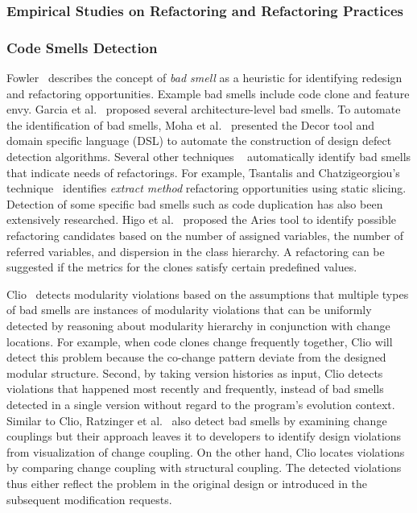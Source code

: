 \documentclass[runningheads,a4paper]{llncs}
\begin{document}
\subsubsection{Empirical Studies on Refactoring and Refactoring Practices} 

\subsubsection{Code Smells Detection} 

Fowler~\cite{fowler:refactor99} describes the concept of {\em bad smell} as a heuristic for identifying redesign and refactoring opportunities. Example bad smells include code clone and feature envy. Garcia et al.~\cite{garcia:csmr09} proposed several architecture-level bad smells. To automate the identification of bad smells, Moha et al.~\cite{moha:fase08} presented the Decor tool and domain specific language (DSL) to automate the construction of design defect detection algorithms.  Several other techniques ~\cite{tsantalis:csmr09, tsantalis:tse09, tsantalis:csmr08} automatically identify bad smells that indicate needs of refactorings. For example, Tsantalis and Chatzigeorgiou's technique~\cite{tsantalis:csmr09} identifies {\em extract method} refactoring opportunities using static slicing. Detection of some specific bad smells such as code duplication has also been extensively researched. Higo et al.~\cite{higo:profes04} proposed the Aries tool to identify possible refactoring candidates based on the number of assigned variables, the number of referred variables, and dispersion in the class hierarchy. A refactoring can be suggested if the metrics for the clones satisfy certain predefined values.

Clio~\cite{Wong2011:cleo} detects modularity violations based on the assumptions that multiple types of bad smells are instances of modularity violations that can be uniformly detected by reasoning about modularity hierarchy in conjunction with change locations.  For example, when code clones change frequently together, Clio will detect this problem because the co-change pattern deviate from the designed modular structure. Second, by taking version histories as input, Clio detects violations that happened most recently and frequently, instead of bad smells detected in a single version without regard to the program's evolution context. Similar to Clio, Ratzinger et al.~\cite{ratzinger:msr05} also detect bad smells by examining change couplings but their approach leaves it to developers to identify design violations from visualization of change coupling. On the other hand, Clio locates violations by comparing change coupling with structural coupling. The detected violations thus either reflect the problem in the original design or introduced in the subsequent modification requests.
\end{document}
